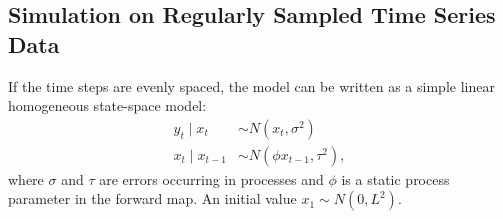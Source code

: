 

\subsection{Simulation on Regularly Sampled Time Series Data}

If the time steps are evenly spaced, the model can be written as a simple linear homogeneous state-space model: 
\begin{align*}
y_t\mid x_t      &\sim N\left(x_t,\sigma^2\right) \\
x_t\mid x_{t-1} &\sim N\left(\phi x_{t-1},\tau^2\right),
\end{align*}
where $\sigma$ and $\tau$ are \iid  errors occurring in processes and $\phi$ is a static process parameter in the forward map. An initial value $x_1\sim N(0,L^2)$. 


